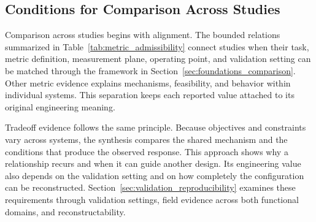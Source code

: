 \subsection{Conditions for Comparison Across Studies}

Comparison across studies begins with alignment. The bounded relations summarized
in Table~\ref{tab:metric_admissibility} connect studies when their task, metric
definition, measurement plane, operating point, and validation setting can be
matched through the framework in Section~\ref{sec:foundations_comparison}.
Other metric evidence explains mechanisms, feasibility, and behavior within
individual systems. This separation keeps each reported value attached to its
original engineering meaning.

Tradeoff evidence follows the same principle. Because objectives and
constraints vary across systems, the synthesis compares the shared mechanism
and the conditions that produce the observed response. This approach shows why
a relationship recurs and when it can guide another design. Its engineering
value also depends on the validation setting and on how completely the
configuration can be reconstructed. Section~\ref{sec:validation_reproducibility}
examines these requirements through validation settings, field evidence across
both functional domains, and reconstructability.
